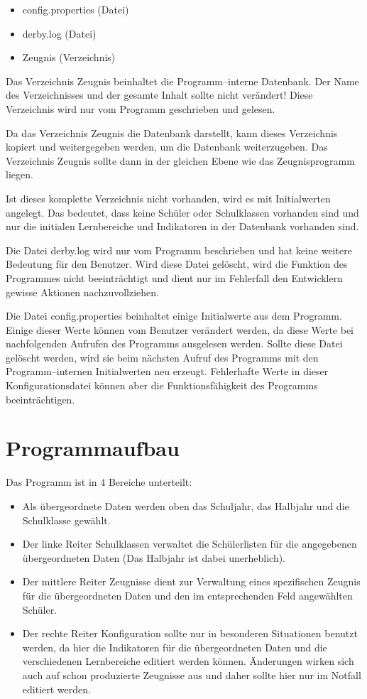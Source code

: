 \documentclass[a4paper,notitlepage,parskip]{scrartcl}
\newcommand\ott{\normalfont\ttfamily}
\begin{document}
\begin{itemize}
\item {\ott config.properties} (Datei)
\item {\ott derby.log} (Datei)
\item {\ott Zeugnis} (Verzeichnis)
\end{itemize}

Das Verzeichnis {\ott Zeugnis} beinhaltet die Programm--interne Datenbank.
Der Name des Verzeichnisses und der gesamte Inhalt sollte nicht verändert! Diese Verzeichnis wird nur vom Programm geschrieben und gelesen.

Da das Verzeichnis {\ott Zeugnis} die Datenbank darstellt, kann dieses Verzeichnis kopiert und weitergegeben werden, um die Datenbank weiterzugeben. Das Verzeichnis {\ott Zeugnis} sollte dann in der gleichen Ebene wie das Zeugnisprogramm liegen.

Ist dieses komplette Verzeichnis nicht vorhanden, wird es mit Initialwerten angelegt. Das bedeutet,
dass keine Schüler oder Schulklassen vorhanden sind und nur die initialen Lernbereiche und Indikatoren in der Datenbank vorhanden sind. 

Die Datei {\ott derby.log} wird nur vom Programm beschrieben und hat keine weitere Bedeutung für den Benutzer. Wird diese Datei gelöscht, wird die Funktion des Programmes nicht beeinträchtigt und dient nur im Fehlerfall den Entwicklern gewisse Aktionen nachzuvollziehen.

Die Datei {\ott config.properties} beinhaltet einige Initialwerte aus dem Programm.
Einige dieser Werte können vom Benutzer verändert werden, da diese Werte bei nachfolgenden Aufrufen des Programms ausgelesen werden. Sollte diese Datei gelöscht werden, wird sie beim nächsten Aufruf des Programms mit den Programm--internen Initialwerten neu erzeugt. Fehlerhafte Werte in dieser Konfigurationsdatei können aber die Funktionsfähigkeit des Programms beeinträchtigen.


\section{Programmaufbau}
Das Programm ist in 4 Bereiche unterteilt:

\begin{itemize}
\item Als  übergeordnete Daten werden oben das Schuljahr, das Halbjahr und die Schulklasse gewählt. 
\item Der linke Reiter {\ott Schulklassen} verwaltet die Schülerlisten für die angegebenen übergeordneten Daten (Das Halbjahr ist dabei unerheblich).
\item Der mittlere Reiter {\ott Zeugnisse} dient zur Verwaltung eines spezifischen Zeugnis für die übergeordneten Daten und den im entsprechenden Feld angewählten Schüler.
\item Der rechte Reiter {\ott Konfiguration} sollte nur in besonderen Situationen benutzt werden, da hier die Indikatoren für die übergeordneten Daten und die verschiedenen Lernbereiche editiert werden können. Änderungen wirken sich auch auf schon produzierte Zeugnisse aus und daher sollte hier nur im Notfall editiert werden.
\end{itemize}
\end{document}
